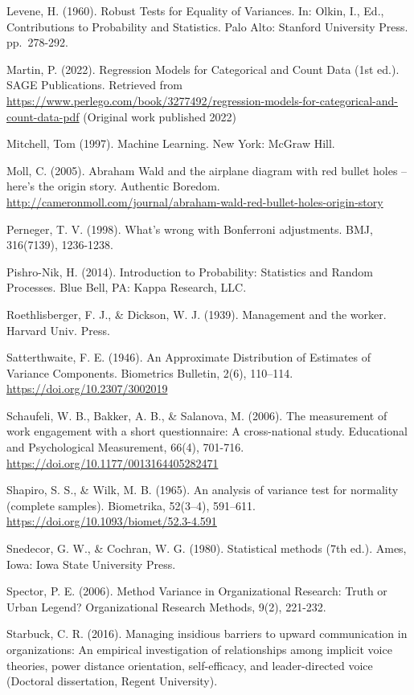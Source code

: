 \documentclass[
]{book}
\begin{document}
Levene, H. (1960). Robust Tests for Equality of Variances. In: Olkin, I., Ed., Contributions to Probability and Statistics. Palo Alto: Stanford University Press. pp.~278-292.

Martin, P. (2022). Regression Models for Categorical and Count Data (1st ed.). SAGE Publications. Retrieved from \url{https://www.perlego.com/book/3277492/regression-models-for-categorical-and-count-data-pdf} (Original work published 2022)

Mitchell, Tom (1997). Machine Learning. New York: McGraw Hill.

Moll, C. (2005). Abraham Wald and the airplane diagram with red bullet holes -- here's the origin story. Authentic Boredom. \url{http://cameronmoll.com/journal/abraham-wald-red-bullet-holes-origin-story}

Perneger, T. V. (1998). What's wrong with Bonferroni adjustments. BMJ, 316(7139), 1236-1238.

Pishro-Nik, H. (2014). Introduction to Probability: Statistics and Random Processes. Blue Bell, PA: Kappa Research, LLC.

Roethlisberger, F. J., \& Dickson, W. J. (1939). Management and the worker. Harvard Univ. Press.

Satterthwaite, F. E. (1946). An Approximate Distribution of Estimates of Variance Components. Biometrics Bulletin, 2(6), 110--114. \url{https://doi.org/10.2307/3002019}

Schaufeli, W. B., Bakker, A. B., \& Salanova, M. (2006). The measurement of work engagement with a short questionnaire: A cross-national study. Educational and Psychological Measurement, 66(4), 701-716. \url{https://doi.org/10.1177/0013164405282471}

Shapiro, S. S., \& Wilk, M. B. (1965). An analysis of variance test for normality (complete samples). Biometrika, 52(3--4), 591--611. \url{https://doi.org/10.1093/biomet/52.3-4.591}

Snedecor, G. W., \& Cochran, W. G. (1980). Statistical methods (7th ed.). Ames, Iowa: Iowa State University Press.

Spector, P. E. (2006). Method Variance in Organizational Research: Truth or Urban Legend? Organizational Research Methods, 9(2), 221-232.

Starbuck, C. R. (2016). Managing insidious barriers to upward communication in organizations: An empirical investigation of relationships among implicit voice theories, power distance orientation, self-efficacy, and leader-directed voice (Doctoral dissertation, Regent University).
\end{document}
